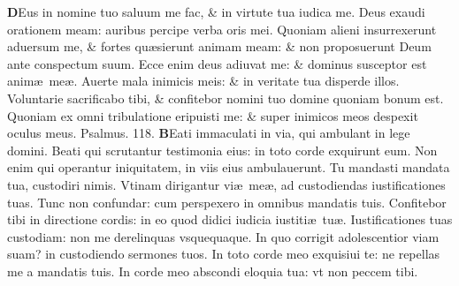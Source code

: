 \documentclass[a5paper,10pt]{book}
\def\ae{æ}
\begin{document}
\begin{multicols*}{2}
\lettrine[lines=2]{\bfseries D}{}Eus in nomine tuo saluum me fac, \& in virtute tua iudica me.
\newline \color{red} D\color{black}eus exaudi orationem meam: auribus percipe verba oris mei.
\newline \color{red} Q\color{black}uoniam alieni insurrexerunt aduersum me, \& fortes qu\ae sierunt animam meam: \& non proposuerunt Deum ante conspectum suum.
\newline \color{red} E\color{black}cce enim deus adiuvat me: \& dominus susceptor est anim\ae \ me\ae .
\newline \color{red} A\color{black}uerte mala inimicis meis: \& in veritate tua disperde illos.
\newline \color{red} V\color{black}oluntarie sacrificabo tibi, \& confitebor nomini tuo domine quoniam bonum est.
\newline \color{red} Q\color{black}uoniam ex omni tribulatione eripuisti me: \& super inimicos meos despexit oculus meus. \quad \color{red} Psalmus. 118. \color{black}
\vspace{-.5em}
\lettrine[lines=2]{\bfseries \color{red} B}{}Eati immaculati in via, qui ambulant in lege domini.
\newline \color{red} B\color{black}eati qui scrutantur testimonia eius: in toto corde exquirunt eum.
\newline \color{red} N\color{black}on enim qui operantur iniquitatem, in viis eius ambulauerunt.
\newline \color{red} T\color{black}u mandasti mandata tua, custodiri nimis.
\newline \color{red} V\color{black}tinam dirigantur vi\ae \ me\ae , ad custodiendas iustificationes tuas.
\newline \color{red} T\color{black}unc non confundar: cum perspexero in omnibus mandatis tuis.
\newline \color{red} C\color{black}onfitebor tibi in directione cordis: in eo quod didici iudicia iustiti\ae \ tu\ae .
\newline \color{red} I\color{black}ustificationes tuas custodiam: non me derelinquas vsquequaque.
\newline \color{red} I\color{black}n quo corrigit adolescentior viam suam? in custodiendo sermones tuos.
\newline \color{red} I\color{black}n toto corde meo exquisiui te: ne repellas me a mandatis tuis.
\newline \color{red} I\color{black}n corde meo abscondi eloquia tua: vt non peccem tibi.

\end{multicols*}
\end{document}
